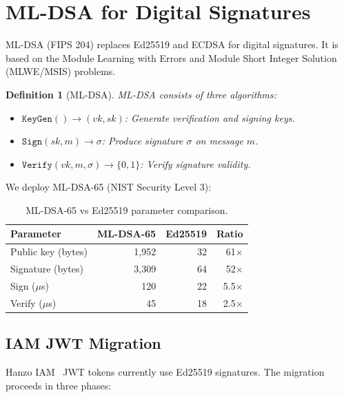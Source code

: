 \documentclass[11pt]{article}
\newtheorem{definition}{Definition}
\begin{document}
\section{ML-DSA for Digital Signatures}
\label{sec:mldsa}

ML-DSA (FIPS 204) replaces Ed25519 and ECDSA for digital signatures. It is
based on the Module Learning with Errors and Module Short Integer Solution
(MLWE/MSIS) problems.

\begin{definition}[ML-DSA]
ML-DSA consists of three algorithms:
\begin{itemize}[leftmargin=1.1em]
    \item $\texttt{KeyGen}() \to (vk, sk)$: Generate verification and
    signing keys.
    \item $\texttt{Sign}(sk, m) \to \sigma$: Produce signature $\sigma$ on
    message $m$.
    \item $\texttt{Verify}(vk, m, \sigma) \to \{0, 1\}$: Verify signature
    validity.
\end{itemize}
\end{definition}

We deploy ML-DSA-65 (NIST Security Level 3):

\begin{table}[H]
\centering
\small
\begin{tabular}{lrrr}
\toprule
\textbf{Parameter} & \textbf{ML-DSA-65} & \textbf{Ed25519} & \textbf{Ratio} \\
\midrule
Public key (bytes) & 1,952 & 32 & 61$\times$ \\
Signature (bytes) & 3,309 & 64 & 52$\times$ \\
Sign ($\mu$s) & 120 & 22 & 5.5$\times$ \\
Verify ($\mu$s) & 45 & 18 & 2.5$\times$ \\
\bottomrule
\end{tabular}
\caption{ML-DSA-65 vs Ed25519 parameter comparison.}
\label{tab:mldsa}
\end{table}

\subsection{IAM JWT Migration}

Hanzo IAM~\cite{hanzoiam} JWT tokens currently use Ed25519 signatures.
The migration proceeds in three phases:
\end{document}

